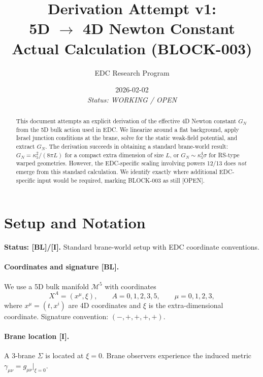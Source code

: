 \documentclass[11pt,a4paper]{article}
\title{\textbf{Derivation Attempt v1:}\\[0.3em]
5D $\to$ 4D Newton Constant\\[0.5em]
\large Actual Calculation (BLOCK-003)}
\author{EDC Research Program}
\date{2026-02-02\\[0.3em]\small\textit{Status: WORKING / OPEN}}
\newcommand{\tagBL}{\textcolor{blue!70!black}{[BL]}}
\newcommand{\tagI}{\textcolor{green!50!black}{[I]}}
\newcommand{\tagOPEN}{\textcolor{red!70!black}{[OPEN]}}
\begin{document}
\maketitle

\begin{abstract}
This document attempts an explicit derivation of the effective 4D Newton constant $G_N$ from the 5D bulk action used in EDC.
We linearize around a flat background, apply Israel junction conditions at the brane, solve for the static weak-field potential, and extract $G_N$.
The derivation succeeds in obtaining a standard brane-world result: $G_N = \kappa_5^2 / (8\pi L)$ for a compact extra dimension of size $L$, or $G_N \sim \kappa_5^4 \sigma$ for RS-type warped geometries.
However, the EDC-specific scaling involving powers 12/13 does \emph{not} emerge from this standard calculation.
We identify exactly where additional EDC-specific input would be required, marking BLOCK-003 as still \tagOPEN{}.
\end{abstract}

\section{Setup and Notation}
\label{sec:setup}

\begin{statusbox}
\textbf{Status: \tagBL{}/\tagI{}.}
Standard brane-world setup with EDC coordinate conventions.
\end{statusbox}

\paragraph{Coordinates and signature \tagBL{}.}
We use a 5D bulk manifold $\mathcal{M}^5$ with coordinates
\begin{equation}
    X^A = (x^\mu, \xi), \qquad A = 0,1,2,3,5, \qquad \mu = 0,1,2,3,
\end{equation}
where $x^\mu = (t, x^i)$ are 4D coordinates and $\xi$ is the extra-dimensional coordinate.
Signature convention: $(-,+,+,+,+)$.

\paragraph{Brane location \tagI{}.}
A 3-brane $\Sigma$ is located at $\xi = 0$.
Brane observers experience the induced metric $\gamma_{\mu\nu} = g_{\mu\nu}|_{\xi=0}$.
\end{document}
